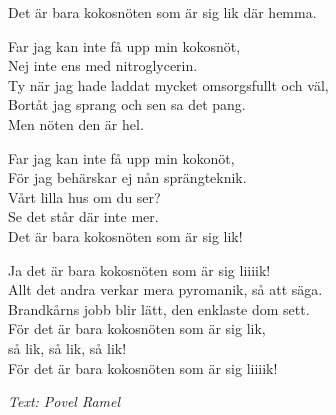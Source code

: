 Det är bara kokosnöten som är sig lik där hemma.\par
\vspace{10pt}
Far jag kan inte få upp min kokosnöt,\\
Nej inte ens med nitroglycerin.\\
Ty när jag hade laddat mycket omsorgsfullt och väl,\\
Bortåt jag sprang och sen sa det pang.\\
Men nöten den är hel.\par
\vspace{10pt}
Far jag kan inte få upp min kokonöt,\\
För jag behärskar ej nån sprängteknik.\\
Vårt lilla hus om du ser?\\
Se det står där inte mer.\\
Det är bara kokosnöten som är sig lik!\par
\vspace{10pt}
Ja det är bara kokosnöten som är sig liiiik!\\
Allt det andra verkar mera pyromanik, så att säga.\\
Brandkårns jobb blir lätt, den enklaste dom sett.\\
För det är bara kokosnöten som är sig lik,\\
så lik, så lik, så lik!\\
För det är bara kokosnöten som är sig liiiik!\par
\vspace{10pt}
{\footnotesize\textit{Text: Povel Ramel}}
